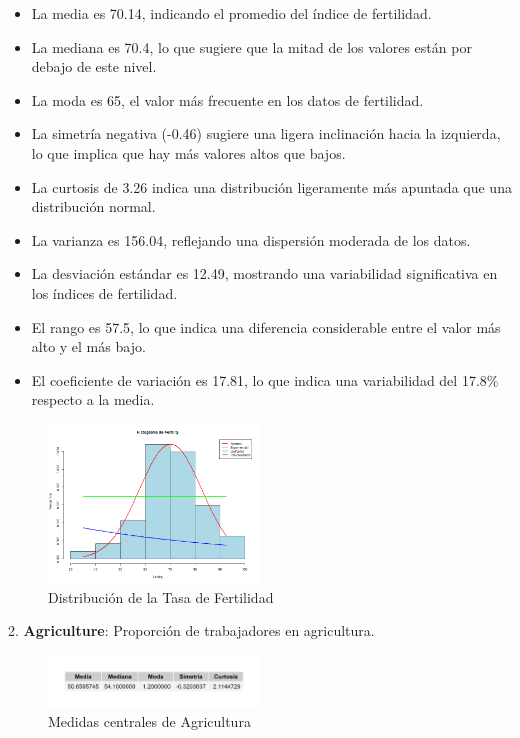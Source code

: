 \documentclass{article}
\begin{document}
   \begin{itemize}
       \item La media es 70.14, indicando el promedio del índice de fertilidad.
       \item La mediana es 70.4, lo que sugiere que la mitad de los valores están por debajo de este nivel.
       \item La moda es 65, el valor más frecuente en los datos de fertilidad.
       \item La simetría negativa (-0.46) sugiere una ligera inclinación hacia la izquierda, lo que implica que hay más valores altos que bajos.
       \item La curtosis de 3.26 indica una distribución ligeramente más apuntada que una distribución normal.
       \item La varianza es 156.04, reflejando una dispersión moderada de los datos.
       \item La desviación estándar es 12.49, mostrando una variabilidad significativa en los índices de fertilidad.
       \item El rango es 57.5, lo que indica una diferencia considerable entre el valor más alto y el más bajo.
       \item El coeficiente de variación es 17.81, lo que indica una variabilidad del 17.8\% respecto a la media.
   \end{itemize}

   \begin{figure}[H]
    \centering
    \includegraphics[width=0.5\textwidth]{Histogramas/histogram_fertility.png}
    \caption{Distribución de la Tasa de Fertilidad}
    \end{figure}

2. \textbf{Agriculture}: Proporción de trabajadores en agricultura.
\begin{figure}[H]
    \centering
    \includegraphics[width=0.5\textwidth]{Swiss/Agriculture_central.png}
    \caption{Medidas centrales de Agricultura}
\end{figure}
\end{document}
